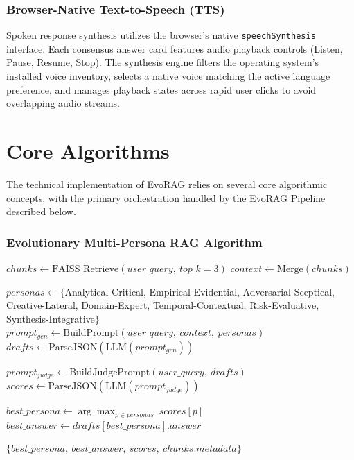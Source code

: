 \subsubsection{Browser-Native Text-to-Speech (TTS)}
Spoken response synthesis utilizes the browser's native \texttt{speechSynthesis} interface. Each consensus answer card features audio playback controls (Listen, Pause, Resume, Stop). The synthesis engine filters the operating system's installed voice inventory, selects a native voice matching the active language preference, and manages playback states across rapid user clicks to avoid overlapping audio streams.

\clearpage

\section{Core Algorithms}

The technical implementation of EvoRAG relies on several core algorithmic concepts,
with the primary orchestration handled by the EvoRAG Pipeline described below.

\subsubsection{Evolutionary Multi-Persona RAG Algorithm}

\vspace{0.5em}

\begin{algorithm}[H]
\caption{EvoRAG Pipeline --- Query to Consensus Response}
\label{alg:query_consensus}
\small
\SetAlgoLined
{}

\BlankLine
{}
$chunks \leftarrow \text{FAISS\_Retrieve}(user\_query,\ top\_k=3)$\;
$context \leftarrow \text{Merge}(chunks)$\;

\BlankLine
{}
$personas \leftarrow \{$Analytical-Critical, Empirical-Evidential, Adversarial-Sceptical,
Creative-Lateral, Domain-Expert, Temporal-Contextual, Risk-Evaluative, Synthesis-Integrative$\}$\;
$prompt_{gen} \leftarrow \text{BuildPrompt}(user\_query,\ context,\ personas)$\;
$drafts \leftarrow \text{ParseJSON}(\text{LLM}(prompt_{gen}))$\;

\BlankLine
{}
$prompt_{judge} \leftarrow \text{BuildJudgePrompt}(user\_query,\ drafts)$\;
$scores \leftarrow \text{ParseJSON}(\text{LLM}(prompt_{judge}))$\;

\BlankLine
{}
$best\_persona \leftarrow \arg\max_{p \in personas}\ scores[p]$\;
$best\_answer \leftarrow drafts[best\_persona].answer$\;

\BlankLine
{}
\Return $\{best\_persona,\ best\_answer,\ scores,\ chunks.metadata\}$\;
\end{algorithm}

